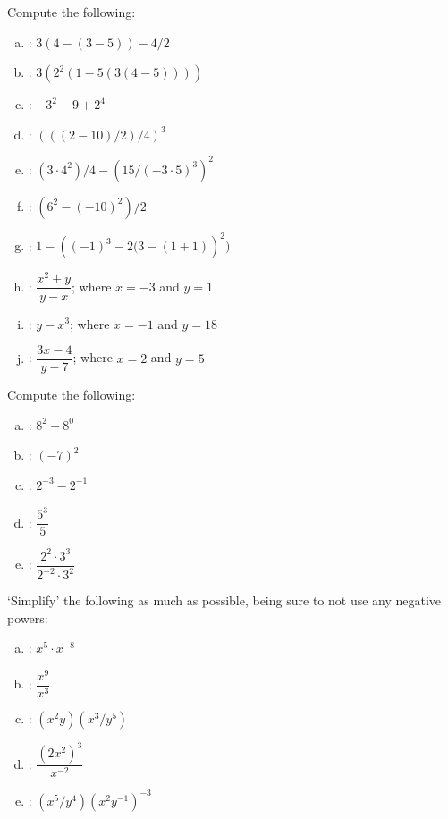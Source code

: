 \documentclass[11pt,letterpaper]{article}
\begin{document}
\newpage



 Compute the following: \pvspace{0.2cm}
\begin{enumerate}[(a)] \itemsep=2ex
\item \uans{3cm}: \qquad $3 \left( 4 - \left(3 - 5 \right) \right) - 4/2$
\item \uans{3cm}: \qquad $3 \left( 2^2 \left( 1 - 5 \left( 3 \left(4 - 5 \right) \right) \right) \right)$
\item \uans{3cm}: \qquad $-3^2 - 9 + 2^4$
\item \uans{3cm}: \qquad $\left( \left( (2 - 10 ) / 2 \right) / 4 \right)^3$
\item \uans{3cm}: \qquad $(3 \cdot 4^2)/4 - \left(15 / \left(-3 \cdot 5 \right)^3 \right)^2$
\item \uans{3cm}: \qquad $\left(6^2 - (-10)^2 \right)/2$
\item \uans{3cm}: \qquad $1 - \left( (-1)^3 - 2(3 - (1 +1) \right)^2 )$
\item \uans{3cm}: \qquad $\dfrac{x^2 + y}{y - x}$; where $x= -3$ and $y= 1$
\item \uans{3cm}: \qquad $y - x^3$; where $x= -1$ and $y= 18$
\item \uans{3cm}: \qquad $\dfrac{3x - 4}{y - 7}$; where $x= 2$ and $y= 5$
\end{enumerate}



\vfill



 Compute the following: \pvspace{0.2cm}
\begin{enumerate}[(a)] \itemsep=2ex
\item \uans{3cm}: \qquad $8^2 - 8^0$
\item \uans{3cm}: \qquad $(-7)^2$
\item \uans{3cm}: \qquad $2^{-3} - 2^{-1}$
\item \uans{3cm}: \qquad $\dfrac{5^3}{5}$
\item \uans{3cm}: \qquad $\dfrac{2^2 \cdot 3^3}{2^{-2} \cdot 3^2}$
\end{enumerate}



\vfill
\newpage



 `Simplify' the following as much as possible, being sure to not use any negative powers: \pvspace{0.2cm}
\begin{enumerate}[(a)] \itemsep=2ex
\item \uans{3cm}: \qquad $x^5 \cdot x^{-8}$
\item \uans{3cm}: \qquad $\dfrac{x^9}{x^3}$
\item \uans{3cm}: \qquad $(x^2 y)(x^3/y^5)$
\item \uans{3cm}: \qquad $\dfrac{(2x^2)^3}{x^{-2}}$
\item \uans{3cm}: \qquad $(x^5/y^4)(x^2 y^{-1})^{-3}$
\end{enumerate}
\end{document}

